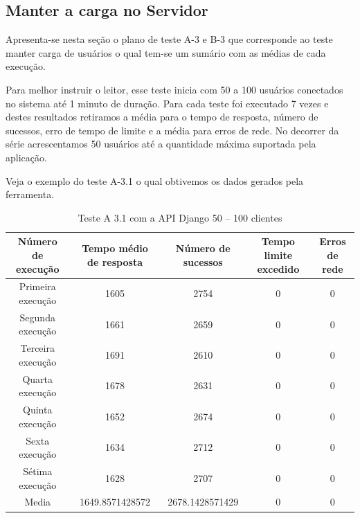     
\subsection{Manter a carga no Servidor}  

    
  Apresenta-se nesta seção o plano de teste A-3 e B-3 que corresponde ao teste manter carga de usuários o qual tem-se um sumário
  com as médias de cada execução.
  
  Para melhor instruir o leitor, esse teste inicia com 50 a 100 usuários conectados no sistema até 1 minuto de duração. Para cada teste
  foi executado 7 vezes e destes resultados retiramos a média para o tempo de resposta, número de sucessos, erro de tempo de limite
  e a média para erros de rede. No decorrer da série acrescentamos 50 usuários até a quantidade máxima suportada pela aplicação.
  
  Veja o exemplo do teste A-3.1 o qual obtivemos os dados gerados pela ferramenta.
  
  \begin{table}[H]
    \centering
    \footnotesize
    \setlength{\abovecaptionskip}{0pt}
    \setlength{\belowcaptionskip}{0pt}
    \caption[Teste A-3.1 com a API Django 50 – 100 clientes]{Teste A 3.1 com a API Django 50 – 100 clientes}
    \label{tab:teste-a-3-1}
    \begin{tabular}{c|c|c|c|c}
      \hline \hline
      Número de execução &	Tempo médio de resposta &	Número de sucessos &	Tempo limite excedido &	 Erros de rede \\
      \hline \hline
      Primeira execução &	1605 &				2754 &			0 &				0 \\
      Segunda execução &	1661 &				2659 &			0 &				0 \\
      Terceira execução &	1691 &				2610 &			0 &				0 \\
      Quarta execução  &	1678 &				2631 &			0 &				0 \\
      Quinta execução  &	1652 &				2674 &			0 &				0 \\
      Sexta execução   &	1634 &				2712 &			0 &				0 \\
      Sétima execução  &	1628 &				2707 &			0 &				0 \\
      Media & 			1649.8571428572 &		2678.1428571429 & 	0 &				0 \\
      \hline \hline
    \end{tabular}
  \end{table}
  
